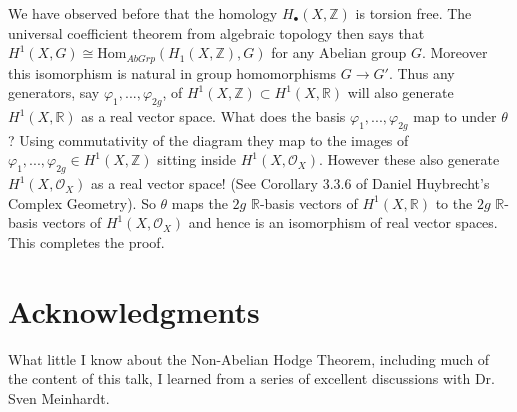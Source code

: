 We have observed before that the homology $H_\bullet(X,\mathbb{Z})$ is torsion free. The universal coefficient theorem from algebraic topology then says that $H^{1}(X,G)\cong\textrm{Hom}_{AbGrp}(H_{1}(X,\mathbb{Z}),G)$ for any Abelian group $G$. Moreover this isomorphism is natural in group homomorphisms $G\rightarrow G'$. Thus any generators, say $\varphi_{1},...,\varphi_{2g}$, of $H^1(X,\mathbb{Z})\subset H^1(X,\mathbb{R})$ will also generate $H^1(X,\mathbb{R})$ as a real vector space. What does the basis $\varphi_{1},...,\varphi_{2g}$ map to under $\theta$? Using commutativity of the diagram they map to the images of $\varphi_{1},...,\varphi_{2g}\in H^1(X,\mathbb{Z})$ sitting inside $H^1(X,\mathcal{O}_{X})$. However these also generate $H^1(X,\mathcal{O}_{X})$ as a real vector space! (See Corollary 3.3.6 of Daniel Huybrecht's Complex Geometry). So $\theta$ maps the $2g$ $\mathbb{R}$-basis vectors of $H^{1}(X,\mathbb{R})$ to the $2g$ $\mathbb{R}$-basis vectors of $H^{1}(X,\mathcal{O}_{X})$ and hence is an isomorphism of real vector spaces. This completes the proof.

\section{Acknowledgments}
What little I know about the Non-Abelian Hodge Theorem, including much of the content of this talk, I learned from a series of excellent discussions with Dr. Sven Meinhardt.









 
